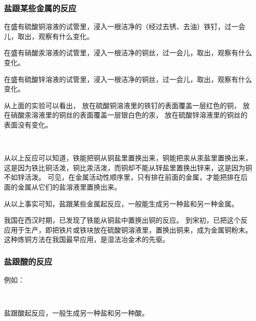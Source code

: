 \subsubsection{盐跟某些金属的反应}

\begin{shiyan}
    在盛有硫酸铜溶液的试管里，浸入一根洁净的（经过去锈、去油）铁钉，过一会儿，取出，观察有什么变化。
\end{shiyan}

\begin{shiyan}
    在盛有硝酸汞溶液的试管里，浸入一根洁净的铜丝，过一会儿，取出，观察有什么变化。
\end{shiyan}

\begin{shiyan}
    在盛有硫酸锌溶液的试管里，浸入一根洁净的铜丝，过一会儿，取出，观察有什么变化。
\end{shiyan}

从上面的实验可以看出，
放在硫酸铜溶液里的铁钉的表面覆盖一层红色的铜，
放在硝酸汞溶液里的铜丝的表面覆盖一层银白色的汞，
放在硫酸锌溶液里的铜丝的表面没有变化。
\begin{fangchengshi}
     \\[-.5em]
\end{fangchengshi}

从以上反应可以知道，铁能把铜从铜盐里置换出来，铜能把汞从汞盐里置换出来，
这是因为铁比铜活泼，铜比汞活泼，而铜却不能从锌盐里置换出锌来，这是因为铜不如锌活泼。
可见，在金属活动性顺序里，只有排在前面的金属，才能把排在后面的金属从它们的盐溶液里置换出来。

从以上事实可知，盐跟某些金属起反应，一般能生成另一种盐和另一种金属。

我国在西汉时期，已发现了铁能从铜盐中置换出铜的反应。
到宋初，已把这个反应用于生产，即把铁片或铁块放在硫酸铜溶液里，置换出铜来，成为金属铜粉末。
这种炼铜方法在我国最早应用，是湿法冶金术的先驱。


\subsubsection{盐跟酸的反应}

例如：
\begin{fangchengshi}
     \\[-.5em]
\end{fangchengshi}

盐跟酸起反应，一般生成另一种盐和另一种酸。


